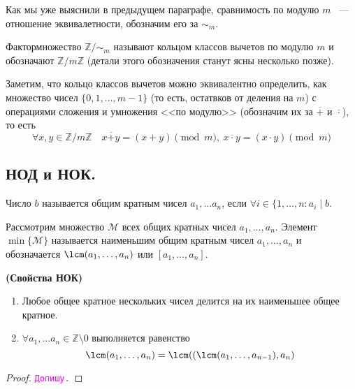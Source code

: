 \documentclass[11pt]{article}
\begin{document}
Как мы уже выяснили в предыдущем параграфе, сравнимость по модулю $m$ ~--- отношение эквивалетности, обозначим его за $\sim_{m}$.

\begin{definition}

	Фактормножество $\mathbb{Z}/\sim_{m}$ называют кольцом классов вычетов по модулю $m$ и обозначают $\mathbb{Z}/m\mathbb{Z}$ (детали этого обозначения станут ясны несколько позже).

\end{definition}
\begin{remark}

    Заметим, что кольцо классов вычетов можно эквивалентно определить, как множество чисел $\{ 0, 1, \ldots, m - 1\}$ (то есть, остатвков от деления на $m$) с операциями сложения и умножения <<по модулю>> (обозначим их за $\overline{+}$ и $\overline{\cdot}$), то есть
	\[ \forall x, y \in \mathbb{Z}/m\mathbb{Z} \quad x \overline{+} y = (x + y)\pmod{m}, \ x \overline{\cdot} y = (x \cdot y)\pmod{m} \]

\end{remark}
\subsection{НОД и НОК.}
\begin{definition}
	Число $b$ называется общим кратным чисел $a_1, \ldots a_n$, если $\forall i \in \{ 1, \ldots, n\colon a_i \mid b$.
\end{definition}
\begin{definition}
	Рассмотрим множество $\mathcal{M}$ всех общих кратных чисел $a_1, \ldots, a_n$. Элемент $\min\{\mathcal{M}\}$ называется наименьшим общим кратным чисел $a_1, \ldots, a_n$
	и обозначается $\lcm(a_1, \ldots, a_n)$ или $[a_1, \ldots, a_n]$.
\end{definition}
\begin{theorem}\textbf{(Свойства НОК)}
\begin{enumerate}
    \item Любое общее кратное нескольких чисел делится на их наименьшее общее кратное.

	\item $\forall a_{1}, \ldots a_n \in \mathbb{Z}\setminus{0}$ выполняется равенство
		  \[ \lcm(a_1, \ldots, a_n) = \lcm((\lcm(a_1, \ldots, a_{n - 1}), a_n ) \]
\end{enumerate}
\end{theorem}
\begin{proof} \textcolor{magenta}{\texttt{Допишу.}}
\end{proof}
\end{document}

